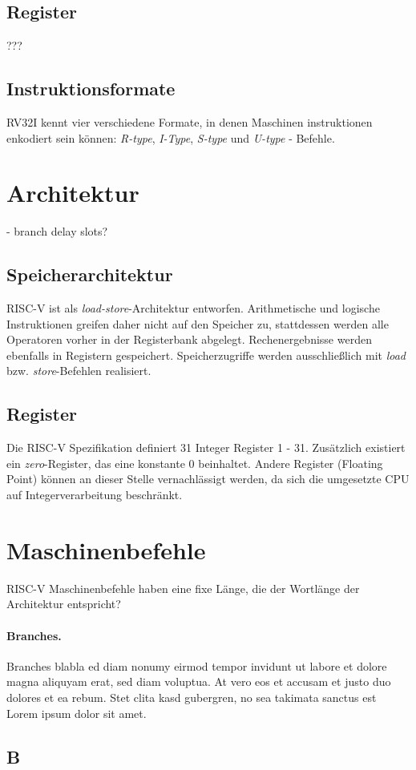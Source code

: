 \subsection{Register}
???

\subsection{Instruktionsformate}
RV32I kennt vier verschiedene Formate, in denen Maschinen instruktionen enkodiert sein können: \textit{R-type}, \textit{I-Type}, \textit{S-type} und \textit{U-type} - Befehle.


\section{Architektur}
- branch delay slots?
\subsection{Speicherarchitektur}
RISC-V ist als \textit{load-store}-Architektur entworfen. Arithmetische und logische Instruktionen greifen daher nicht auf den Speicher zu, stattdessen werden alle Operatoren vorher in der Registerbank abgelegt. Rechenergebnisse werden ebenfalls in Registern gespeichert. Speicherzugriffe werden ausschließlich mit \textit{load} bzw. \textit{store}-Befehlen realisiert.

\subsection{Register}
Die RISC-V Spezifikation definiert 31 Integer Register 1 - 31. Zusätzlich existiert ein \textit{zero}-Register, das eine konstante 0 beinhaltet. Andere Register (Floating Point) können an dieser Stelle vernachlässigt werden, da sich die umgesetzte CPU auf Integerverarbeitung beschränkt.

\section{Maschinenbefehle}
RISC-V Maschinenbefehle haben eine fixe Länge, die der Wortlänge der Architektur entspricht?
\paragraph{Branches.} Branches blabla ed diam nonumy eirmod tempor invidunt ut labore et dolore magna aliquyam erat, sed diam voluptua. At vero eos et accusam et justo duo dolores et ea rebum. Stet clita kasd gubergren, no sea takimata sanctus est Lorem ipsum dolor sit amet.
\subsection{B}
